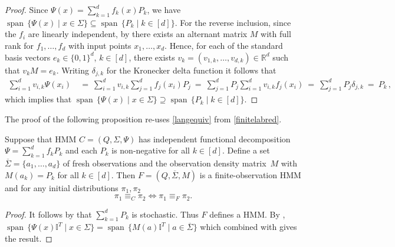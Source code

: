 \documentclass[a4paper,UKenglish,cleveref, autoref,mathscr, amsthm, thmtools, thm-restate]{lipics-v2019}
\newcommand{\RR}{\mathbb{R}}
\newcommand{\1}{\mathbb{I}}
\DeclareMathOperator{\Span}{span\,}
\begin{document}
\begin{proof}
Since $\Psi(x) = \sum_{k = 1}^d f_k(x) P_k$, we have $\Span \{\Psi(x) \mid x \in \Sigma\} \subseteq \Span \{P_k \mid k \in [d]\}$. For the reverse inclusion, since the $f_i$ are linearly independent, by  there exists an alternant matrix $M$ with full rank for $f_1, \dots, f_d$ with input points $x_1, \dots, x_d$.
Hence, for each of the standard basis vectors $e_k \in \{0,1\}^d$, $k \in [d]$, there exists $v_k = (v_{1,k} ,\dots, v_{d,k}) \in \RR^d$ such that $v_k M = e_k$. Writing $\delta_{j,k}$ for the Kronecker delta function it follows that
\begin{equation*}
\begin{split}
\sum_{i = 1}^d v_{i,k} \Psi(x_i) & \ = \ \sum_{i = 1}^d v_{i,k} \sum_{j = 1}^d f_j(x_i) P_j
 \ = \ \sum_{j = 1}^d P_j \sum_{i = 1}^d v_{i,k} f_j(x_i)
 \ = \ \sum_{j = 1}^d P_j \delta_{j,k}
 \ = \ P_k\,,
\end{split}
\end{equation*}
which implies that $\Span \{\Psi(x) \mid x \in \Sigma\} \supseteq \Span \{P_k \mid k \in [d]\}.$
\end{proof}

The proof of the following proposition re-uses \cref{langequiv} from \cref{finitelabred}.
\begin{proposition}\label{nonnegreduction}
Suppose that HMM $C = (Q, \Sigma, \Psi)$ has independent functional decomposition $\Psi = \sum_{k = 1}^d f_k P_k$ and each  $P_k$ is non-negative for all $k \in [d]$. Define a set $\overline{\Sigma} = \{ a_1, \dots, a_d \}$ of fresh observations and the observation density matrix~$M$ with
$M(a_k) = P_k$ for all $k \in [d]$. Then $F = (Q, \overline{\Sigma}, M)$ is a finite-observation HMM and for any initial distributions $\pi_1, \pi_2$
\[\pi_1 \equiv_C \pi_2 \iff \pi_1 \equiv_F \pi_2. \]
\end{proposition}

\begin{proof}
It follows by  that $\sum_{k = 1}^d P_k$ is stochastic. Thus $F$ defines a HMM. By ,  $\Span \{\Psi(x)\1^T \mid x \in \Sigma\} = \Span \{M(a)\1^T \mid a \in \overline{\Sigma}\}$ which combined with  gives the result.
\end{proof}
\end{document}

